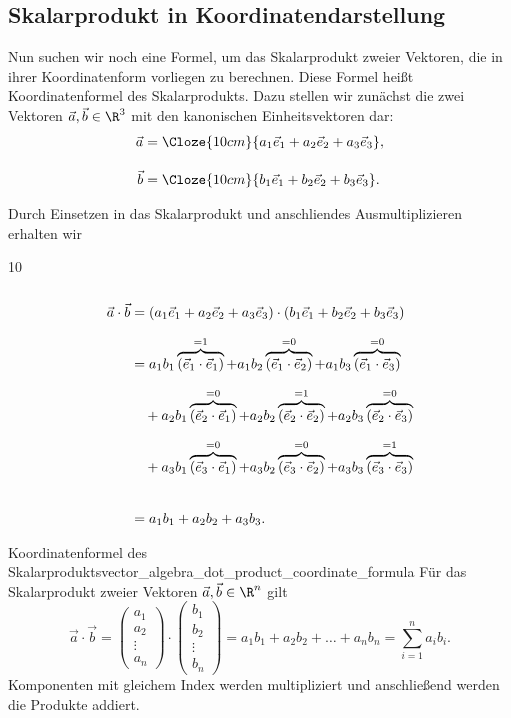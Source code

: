 \clearpage
\subsection{Skalarprodukt in Koordinatendarstellung}
\label{subsec:vector_algebra_dot_product_coordinates}

Nun suchen wir noch eine Formel, um das Skalarprodukt zweier Vektoren,
die in ihrer Koordinatenform vorliegen zu berechnen. Diese Formel heißt
Koordinatenformel des Skalarprodukts.
Dazu stellen wir zunächst die zwei Vektoren $\vec a,\vec b\in\R^3$ mit
den kanonischen Einheitsvektoren dar:
\[
  \begin{aligned}
    \vec a
      &=\Cloze{10cm}{a_1\vec e_1+a_2\vec e_2+a_3\vec e_3},\\[1em]
    \vec b
      &=\Cloze{10cm}{b_1\vec e_1+b_2\vec e_2+b_3\vec e_3}.
  \end{aligned}
\]

Durch Einsetzen in das Skalarprodukt und anschliendes Ausmultiplizieren erhalten wir
\begin{ClozeArea}[34]{10}
  \[
    \begin{aligned}
      \vec a\cdot\vec b
      &=(a_1\vec e_1+a_2\vec e_2+a_3\vec e_3)
        \cdot(b_1\vec e_1+b_2\vec e_2+b_3\vec e_3)
        \vphantom{\overbrace{(\vec e_1\cdot\vec e_1)}^{=1}}\\[0.7em]
      &=a_1b_1\overbrace{(\vec e_1\cdot\vec e_1)}^{=1}
        +a_1b_2\overbrace{(\vec e_1\cdot\vec e_2)}^{=0}
        +a_1b_3\overbrace{(\vec e_1\cdot\vec e_3)}^{=0}\\[0.7em]
      &\quad
        +a_2b_1\overbrace{(\vec e_2\cdot\vec e_1)}^{=0}
        +a_2b_2\overbrace{(\vec e_2\cdot\vec e_2)}^{=1}
        +a_2b_3\overbrace{(\vec e_2\cdot\vec e_3)}^{=0}\\[0.7em]
      &\quad
        +a_3b_1\overbrace{(\vec e_3\cdot\vec e_1)}^{=0}
        +a_3b_2\overbrace{(\vec e_3\cdot\vec e_2)}^{=0}
        +a_3b_3\overbrace{(\vec e_3\cdot\vec e_3)}^{=1}\\[0.7em]
      &=a_1b_1+a_2b_2+a_3b_3
        \vphantom{\overbrace{(\vec e_1\cdot\vec e_1)}^{=1}}.
    \end{aligned}
  \]
\end{ClozeArea}

\begin{TheoremBox}{Koordinatenformel des Skalarprodukts}{vector_algebra_dot_product_coordinate_formula}
  Für das Skalarprodukt zweier Vektoren $\vec a,\vec b\in\R^n$ gilt
  \[
    \vec a\cdot\vec b
    =\begin{pmatrix}
      a_1\\a_2\\\vdots\\a_n
    \end{pmatrix}
    \cdot
    \begin{pmatrix}
      b_1\\b_2\\\vdots\\b_n
    \end{pmatrix}
    =a_1b_1+a_2b_2+\dots+a_nb_n
    =\sum_{i=1}^{n}a_i b_i.
  \]
  Komponenten mit gleichem Index werden multipliziert und anschließend werden
  die Produkte addiert.
\end{TheoremBox}

